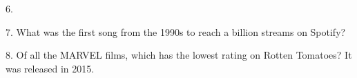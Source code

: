 \begin{frame}
\begin{center}
\Large
6. 
\end{center}
\end{frame}
\begin{frame}
\begin{center}
\Large
7. What was the first song from the 1990s to reach a billion streams on Spotify?
\\
\end{center}
\end{frame}
\begin{frame}
\begin{center}
\Large
8. Of all the MARVEL films, which has the lowest rating on Rotten Tomatoes? It was released in 2015.
\\
\\
\end{center}
\end{frame}
